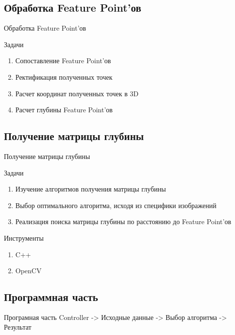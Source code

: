 \documentclass{beamer}
\newcommand{\cimg}[2]{%
	\begin{center}%
		\ifthenelse{\equal{#2}{}}{%
			\texttt{[image: \#1]}
		}{%
			\texttt{[image: \#1]}
		}%
	\end{center}%
}
\begin{document}
\subsection{Обработка Feature Point'ов}
\begin{frame}[t]{Обработка Feature Point'ов}
	\begin{description}
		\item Задачи
		\begin{enumerate}
			\item Сопоставление Feature Point’ов
			\item Ректификация полученных точек
			\item Расчет координат полученных точек в 3D
			\item Расчет глубины Feature Point’ов
		\end{enumerate}
	\end{description}
	\cimg{06.png}{0.3}
\end{frame}

\subsection{Получение матрицы глубины}
\begin{frame}[t]{Получение матрицы глубины}
	\begin{description}
		\item Задачи
		\begin{enumerate}
			\item Изучение алгоритмов получения матрицы глубины 
			\item Выбор оптимального алгоритма, исходя из специфики изображений
			\item Реализация поиска матрицы глубины по расстоянию до Feature Point’ов
		\end{enumerate}
		\item Инструменты
		\begin{enumerate}
			\item C++
			\item OpenCV
		\end{enumerate}
	\end{description}
\end{frame}

\subsection{Программная часть}
\begin{frame}[t]{Програмная часть}
		Controller -> Исходные данные -> Выбор алгоритма -> Результат 
		\cimg{5.png}{0.5}
\end{frame}
\end{document}
